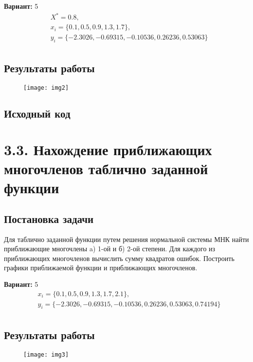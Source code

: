{\bfseries Вариант:} 5
\begin{align*}
& X^* = 0.8, \\
& x_i = \{0.1, 0.5, 0.9, 1.3, 1.7\}, \\
& y_i = \{-2.3026, -0.69315, -0.10536, 0.26236, 0.53063\} \\
\end{align*}

\subsection{Результаты работы}
\begin{figure}[h!]
\centering
\texttt{[image: img2]}
\end{figure}
\pagebreak

\subsection{Исходный код}

\pagebreak

\section* {3.3. Нахождение приближающих многочленов таблично заданной функции}

\setcounter{subsection}{0}


\subsection{Постановка задачи}
Для таблично заданной функции путем решения нормальной системы МНК найти приближающие многочлены a) 1-ой  и б) 2-ой степени. Для каждого из приближающих многочленов вычислить сумму квадратов ошибок. Построить графики приближаемой функции и приближающих многочленов.  

{\bfseries Вариант:} 5
\begin{align*}
& x_i = \{0.1, 0.5, 0.9, 1.3, 1.7, 2.1\}, \\
& y_i = \{-2.3026, -0.69315, -0.10536, 0.26236, 0.53063, 0.74194\} \\
\end{align*}

\subsection{Результаты работы}
\begin{figure}[h!]
\centering
\texttt{[image: img3]}
\end{figure}
\pagebreak

